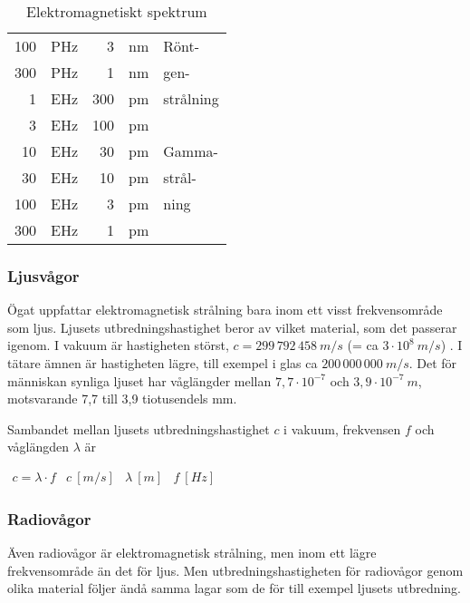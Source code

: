 \begin{table}
\begin{center}
\begin{tabular}{|rl|rl|l|}
100 & PHz &   3 & nm & Rönt-\\
300 & PHz &   1 & nm & gen-\\
  1 & EHz & 300 & pm & strålning\\ \cline{5-5}
  3 & EHz & 100 & pm & \\
 10 & EHz &  30 & pm & Gamma-\\
 30 & EHz &  10 & pm & strål-\\
100 & EHz &   3 & pm & ning\\
300 & EHz &   1 & pm & \\
\hline
\end{tabular}
\end{center}
\caption{Elektromagnetiskt spektrum}
\label{tab:elektromagnetiskt_spektrum}
\end{table}

\subsubsection{Ljusvågor}

Ögat uppfattar elektromagnetisk strålning bara inom ett visst frekvensområde
som ljus.
Ljusets utbredningshastighet beror av vilket material, som det passerar igenom.
I vakuum är hastigheten störst, \(c = 299\, 792\, 458\ m/s\)
(= ca \(3 \cdot 10^8\ m/s\)) \cite{SIbrochure8}.
I tätare ämnen är hastigheten lägre, till exempel i glas ca \(200\, 000\, 000\ m/s\).
Det för människan synliga ljuset har våglängder mellan \(7,7 \cdot 10^{-7}\)
och \(3,9 \cdot 10^{-7}\ m\), motsvarande 7,7 till 3,9 tiotusendels mm.

Sambandet mellan ljusets utbredningshastighet \(c\) i vakuum, frekvensen \(f\)
och våglängden \(\lambda\) är

\(
\begin{array}{llll}
c = \lambda \cdot f & c \ [m/s] & \lambda \ [m] & f \ [Hz]
\end{array}
\)

\subsubsection{Radiovågor}

Även radiovågor är elektromagnetisk strålning, men inom ett lägre
frekvensområde än det för ljus.
Men utbredningshastigheten för radiovågor genom olika material följer ändå
samma lagar som de för till exempel ljusets utbredning.

